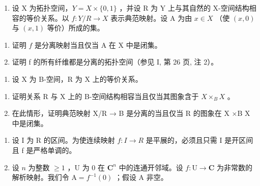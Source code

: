 \exercisegroup

\begin{enumerate}
\def\labelenumi{\arabic{enumi})}
\tightlist
\item
  设 X 为拓扑空间，\(Y = X \times \{0, 1\}\) ，并设 R 为 Y 上与其自然的 X-空间结构相容的等价关系。以 \(f: Y/R \to X\) 表示典范映射。设 A 为由 \(x \in X\) （使 \((x, 0)\) 与 \((x, 1)\) 等价）所成的集。
\end{enumerate}

\begin{enumerate}
\def\labelenumi{\alph{enumi})}
\item
  证明 \(f\) 是分离映射当且仅当 A 在 X 中是闭集。
\item
  证明 f 的所有纤维都是分离的拓扑空间（参见 I, 第 26 页, 注 2）。
\end{enumerate}

\begin{enumerate}
\def\labelenumi{\arabic{enumi})}
\setcounter{enumi}{1}
\tightlist
\item
  设 X 为 B-空间，R 为 X 上的等价关系。
\end{enumerate}

\begin{enumerate}
\def\labelenumi{\alph{enumi})}
\item
  证明关系 R 与 X 上的 B-空间结构相容当且仅当其图象含于 \(X \times_{B} X\) 。
\item
  在此情形，证明典范映射 X/R → B 是分离的当且仅当 R 的图象在 X ×B X 中是闭集。
\end{enumerate}

\begin{enumerate}
\def\labelenumi{\arabic{enumi})}
\setcounter{enumi}{2}
\item
  设 I 为 R 的区间。为使连续映射 \(f: I \rightarrow R\) 是平展的，必须且只需 I 是开区间且 f 是严格单调的。
\item
  设 \(n\) 为整数 \(\geqslant 1\) ，U 为 0 在 \(\mathbf{C}^n\) 中的连通开邻域。设 \(f: \mathrm{U} \to \mathbf{C}\) 为非常数的解析映射。我们令 \(\mathrm{A} = f^{-1}(0)\) ；假设 A 非空。
\end{enumerate}

